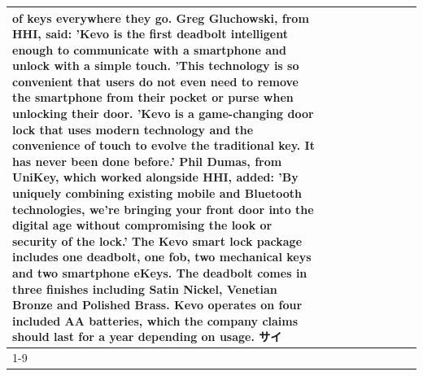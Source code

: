 \begin{table}[H]
\begin{tabular}{lllrlllll}
of keys everywhere they go. Greg Gluchowski, from HHI, said: 'Kevo is the first deadbolt intelligent enough to communicate with a smartphone and unlock with a simple touch. 'This technology is so convenient that users do not even need to remove the smartphone from their pocket or purse when unlocking their door. 'Kevo is a game-changing door lock that uses modern technology and the convenience of touch to evolve the traditional key. It has never been done before.' Phil Dumas, from UniKey, which worked alongside HHI, added: 'By uniquely combining existing mobile and Bluetooth technologies, we’re bringing your front door into the digital age without compromising the look or security of the lock.' The Kevo smart lock package includes one deadbolt, one fob, two mechanical keys and two smartphone eKeys. The deadbolt comes in three finishes including Satin Nickel, Venetian Bronze and Polished Brass. Kevo operates on four included AA batteries, which the company claims should last for a year depending on usage. サイ \\
\cline{1-9}

\end{tabular}
\end{table}
